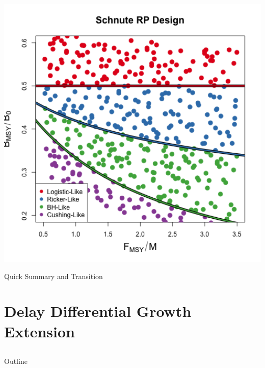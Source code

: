 \documentclass[ xcolor = pdftex, dvipsnames, table ]{beamer}
\begin{document}
\begin{frame}
\begin{minipage}[h!]{0.49\textwidth}
        \includegraphics[width=1\textwidth]{../../ddBias/designLineColorHHardFlatT30N150WWideN112.png}
\end{minipage}
\end{frame}

\begin{frame}{}
\color{red}Quick Summary and Transition
\end{frame}

%
\section{Delay Differential Growth Extension}
\subsection{}
\begin{frame}{Outline}
\end{frame}
\end{document}
